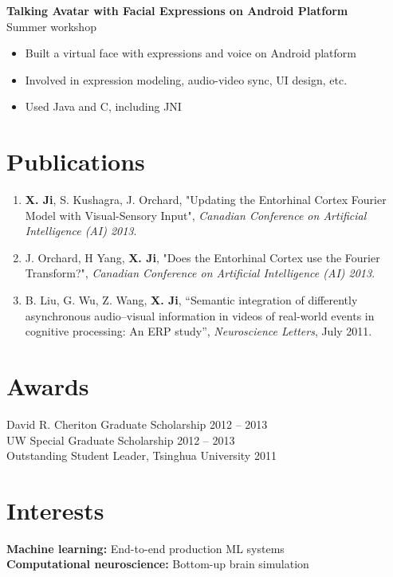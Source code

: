 \documentclass[margin]{res}
\begin{document}
\begin{resume}
 {\bf Talking Avatar with Facial Expressions on Android Platform}\\
 Summer workshop
  \begin{itemize} \itemsep -2pt
   \item Built a virtual face with expressions and voice on Android platform
   \item Involved in expression modeling, audio-video sync, UI design, etc.
   \item Used Java and C, including JNI
 \end{itemize}



\section{Publications} 

 \begin{enumerate} \itemsep -2pt
\item {\bf X. Ji}, S. Kushagra, J. Orchard, "Updating the Entorhinal Cortex Fourier Model with Visual-Sensory Input", {\em Canadian Conference on Artificial Intelligence (AI) 2013}.
\item J. Orchard, H Yang, {\bf X. Ji}, "Does the Entorhinal Cortex use the Fourier Transform?",  {\em Canadian Conference on Artificial Intelligence (AI) 2013}.
\item B. Liu, G. Wu, Z. Wang, {\bf X. Ji}, ``Semantic integration of differently asynchronous audio–visual information in videos of real-world events in cognitive processing: An ERP study'', {\em Neuroscience Letters}, July 2011. 
\end{enumerate}


\section{Awards}

David R. Cheriton Graduate Scholarship \hfill 2012 -- 2013\\
UW Special Graduate Scholarship \hfill 2012 -- 2013\\
Outstanding Student Leader, Tsinghua University \hfill 2011\\



\section{Interests}
{\bf Machine learning:} End-to-end production ML systems\\
{\bf Computational neuroscience:} Bottom-up brain simulation\\

\end{resume} 
\end{document}
